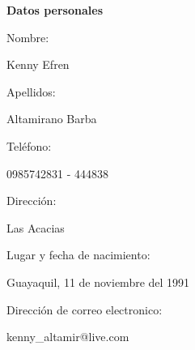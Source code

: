 \documentclass[11pt]{article}
\begin{document}
\begin{center}
\begin{huge}
\textbf{Datos personales}
\end{huge}
\end{center}

\begin{flushleft}
\begin{large}
Nombre:
\end{large}
Kenny Efren

\begin{large}
Apellidos:
\end{large}
Altamirano Barba

\begin{large}
Teléfono:
\end{large}
0985742831 - 444838

\begin{large}
Dirección:
\end{large}
Las Acacias

\begin{large}
Lugar y fecha de nacimiento:
\end{large}
Guayaquil, 11 de noviembre del 1991

\begin{large}
Dirección de correo electronico:
\end{large}
kenny\_altamir@live.com


\end{flushleft}
\end{document}

